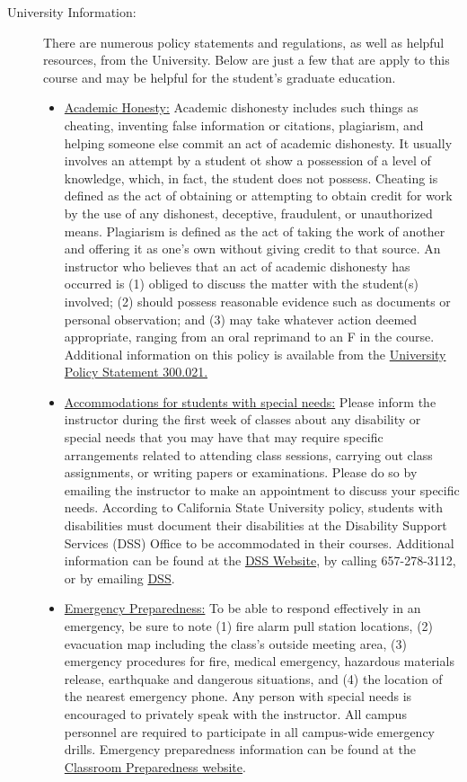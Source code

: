 \documentclass[11pt]{article}
\begin{document}
\begin{description}
	\item[University Information:] There are numerous policy statements and regulations, as well as helpful resources, from the University. Below are just a few that are apply to this course and may be helpful for the student's graduate education.
	\begin{itemize}
		
		\item \underline{Academic Honesty:} Academic dishonesty includes such things as cheating, inventing false information or citations, plagiarism, and helping someone else commit an act of academic dishonesty. It usually involves an attempt by a student ot show a possession of a level of knowledge, which, in fact, the student does not possess. Cheating is defined as the act of obtaining or attempting to obtain credit for work by the use of any dishonest, deceptive, fraudulent, or unauthorized means. Plagiarism is defined as the act of taking the work of another and offering it as one's own without giving credit to that source. An instructor who believes that an act of academic dishonesty has occurred is (1) obliged to discuss the matter with the student(s) involved; (2) should possess reasonable evidence such as documents or personal observation; and (3) may take whatever action deemed appropriate, ranging from an oral reprimand to an F in the course. Additional information on this policy is available from the \href{http://www.fullerton.edu/senate/publications_policies_resolutions/ups/UPS 300/UPS 300.021.pdf}{University Policy Statement 300.021.}
		
		\item \underline{Accommodations for students with special needs:} Please inform the instructor during the first week of classes about any disability or special needs that you may have that may require specific arrangements related to attending class sessions, carrying out class assignments, or writing papers or examinations. Please do so by emailing the instructor to make an appointment to discuss your specific needs. According to California State University policy, students with disabilities must document their disabilities at the Disability Support Services (DSS) Office to be accommodated in their courses. Additional information can be found at the \href{http://www.fullerton.edu/dss}{DSS Website}, by calling 657-278-3112, or by emailing  \href{mailto:dsservices@fullerton.edu}{DSS}. 
		
		\item \underline{Emergency Preparedness:} To be able to respond effectively in an emergency, be sure to note (1) fire alarm pull station locations, (2) evacuation map including the class's outside meeting area, (3) emergency procedures for fire, medical emergency, hazardous materials release, earthquake and dangerous situations, and (4) the location of the nearest emergency phone. Any person with special needs is encouraged to privately speak with the instructor. All campus personnel are required to participate in all campus-wide emergency drills. Emergency preparedness information can be found at the \href{http://prepare.fullerton.edu/campuspreparedness/ClassroomPreparedness.asp}{Classroom Preparedness website}. 
		

\end{itemize}
\end{description}
\end{document}
